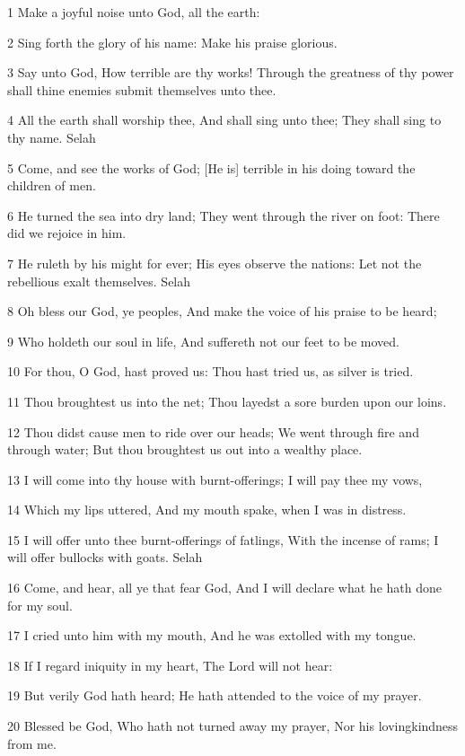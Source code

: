 \par 1 Make a joyful noise unto God, all the earth:
\par 2 Sing forth the glory of his name: Make his praise glorious.
\par 3 Say unto God, How terrible are thy works! Through the greatness of thy power shall thine enemies submit themselves unto thee.
\par 4 All the earth shall worship thee, And shall sing unto thee; They shall sing to thy name. Selah
\par 5 Come, and see the works of God; [He is] terrible in his doing toward the children of men.
\par 6 He turned the sea into dry land; They went through the river on foot: There did we rejoice in him.
\par 7 He ruleth by his might for ever; His eyes observe the nations: Let not the rebellious exalt themselves. Selah
\par 8 Oh bless our God, ye peoples, And make the voice of his praise to be heard;
\par 9 Who holdeth our soul in life, And suffereth not our feet to be moved.
\par 10 For thou, O God, hast proved us: Thou hast tried us, as silver is tried.
\par 11 Thou broughtest us into the net; Thou layedst a sore burden upon our loins.
\par 12 Thou didst cause men to ride over our heads; We went through fire and through water; But thou broughtest us out into a wealthy place.
\par 13 I will come into thy house with burnt-offerings; I will pay thee my vows,
\par 14 Which my lips uttered, And my mouth spake, when I was in distress.
\par 15 I will offer unto thee burnt-offerings of fatlings, With the incense of rams; I will offer bullocks with goats. Selah
\par 16 Come, and hear, all ye that fear God, And I will declare what he hath done for my soul.
\par 17 I cried unto him with my mouth, And he was extolled with my tongue.
\par 18 If I regard iniquity in my heart, The Lord will not hear:
\par 19 But verily God hath heard; He hath attended to the voice of my prayer.
\par 20 Blessed be God, Who hath not turned away my prayer, Nor his lovingkindness from me.


